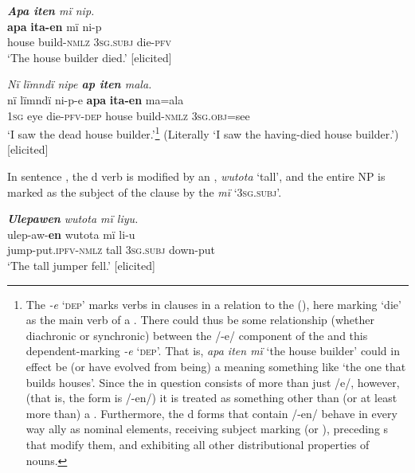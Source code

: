 \ea%
    \label{ex:nouns:22}
          \textit{\textbf{Apa iten} mï nip.}\\
\gll    \textbf{apa}  \textbf{ita-en}      mï      ni-p\\
    house  build-\textsc{nmlz}  \textsc{3sg.subj}  die-\textsc{pfv}\\
\glt `The house builder died.’ [elicited]
\z

\newpage

\ea%
    \label{ex:nouns:23}
          \textit{Nï lïmndï nipe \textbf{ap iten} mala.}\\
\gll    nï    lïmndï  ni-p-e      \textbf{apa}  \textbf{ita-en}      ma=ala\\
    \textsc{1sg}  eye    die-\textsc{pfv-dep}  house  build-\textsc{nmlz}  \textsc{3sg.obj}=see\\
\glt `I saw the dead house builder.’\footnote{The  \textit{-e} ‘\textsc{dep}’ marks verbs in clauses in a  relation to the  (), here marking ‘die’ as the main verb of a . There could thus be some relationship (whether diachronic or synchronic) between the /-e/ component of the   and this  dependent-marking  \textit{-e} ‘\textsc{dep}’. That is, \textit{apa iten mï} ‘the house builder’ could in effect be (or have evolved from being) a  meaning something like ‘the one that builds houses’. Since the  in question consists of more than just /e/, however, (that is, the form is /-en/) it is treated as something other than (or at least more than) a . Furthermore, the d forms that contain /-en/ behave in every way ally as nominal elements, receiving subject marking (or ), preceding s that modify them, and exhibiting all other distributional properties of nouns.} (Literally ‘I saw the having-died house builder.’) [elicited]
\z

  In sentence , the d verb is modified by an , \textit{wutota} ‘tall’, and the entire NP is marked as the subject of the clause by the  \textit{mï} ‘3\textsc{sg.subj}’.

\ea%
    \label{ex:nouns:25}
          \textbf{\textit{Ulepawen}} \textit{wutota mï liyu.}\\
\gll    ulep-aw-\textbf{en}      wutota  mï      li-u\\
    jump-put.\textsc{ipfv-nmlz}  tall    \textsc{3sg.subj}  down-put\\
\glt `The tall jumper fell.’ [elicited]
\z

